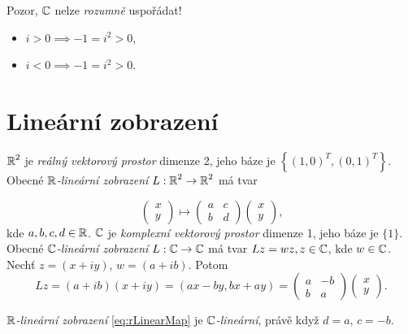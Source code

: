 
Pozor, $\operatorname{\mathbb{C}}  $ nelze \emph{rozumně} uspořádat!
\begin{itemize}
    \item $i>0\implies -1=i^2>0$,
    \item $i<0\implies -1=i^2>0$.
\end{itemize}


\section{Lineární zobrazení}
\begin{definition}
$\operatorname{\mathbb{R}} ^2$ je \emph{reálný vektorový prostor} dimenze 2, jeho báze je $\left\{(1,0)^T, (0,1)^T\right\}$. Obecné $\operatorname{\mathbb{R}} $\emph{-lineární zobrazení} $L:\operatorname{\mathbb{R}} ^2\to\operatorname{\mathbb{R}} ^2$ má tvar 

\begin{equation}\label{eq:rLinearMap}
\begin{pmatrix}
x \\ y
\end{pmatrix}
\longmapsto
\begin{pmatrix}
a & c\\
b & d
\end{pmatrix}
\begin{pmatrix}
x \\ y
\end{pmatrix}
\text{,}
\end{equation}
kde $a,b,c,d\in\operatorname{\mathbb{R}} $.
$\operatorname{\mathbb{C}}  $ je \emph{komplexní vektorový prostor} dimenze 1, jeho báze je $\{1\}$. Obecné $\operatorname{\mathbb{C}}  $\emph{-lineární zobrazení} $L:\operatorname{\mathbb{C}}  \to\operatorname{\mathbb{C}}  $ má tvar $Lz = wz, z\in\operatorname{\mathbb{C}}  $, kde $w\in\operatorname{\mathbb{C}}  $. Nechť $z = (x+iy)$, $ w=(a+ib)$. 
Potom $$Lz=(a+ib)(x+iy)= (ax-by, bx+ay) = 
\begin{pmatrix}
a & -b\\
b & a
\end{pmatrix}
\begin{pmatrix}
x \\ y
\end{pmatrix}\text{.}$$
\end{definition}

\begin{observation}
$\operatorname{\mathbb{R}} $\emph{-lineární zobrazení} \cref{eq:rLinearMap} je $\operatorname{\mathbb{C}}  $\emph{-lineární}, právě když $d = a$, $ c = -b$.
\end{observation} 

